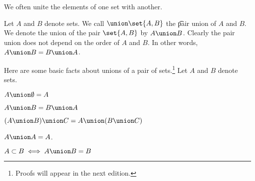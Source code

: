 

We often unite the elements of one set with another.


Let $A$ and $B$ denote sets.
We call $\union \set{A, B}$ the \t{pair union} of $A$ and $B$.
We denote the union of the pair $\set{A, B}$ by $A \union B$.
Clearly the pair union does not depend on the order of $A$ and $B$.
In other words, $A \union B = B \union A$.


Here are some basic facts about unions of a pair of sets.\footnote{Proofs will appear in the next edition.}
Let $A$ and $B$ denote sets.

\begin{proposition}
  $A \union \emptyset = A$
  \label{pair_unions:identity_element}
\end{proposition}

\begin{proposition}[Commutativity]
  $A \union B = B \union A$
\end{proposition}

\begin{proposition}[Associativity]
  $(A \union B) \union C = A \union (B \union C)$
\end{proposition}

\begin{proposition}[Idempotence]
  $A \union A = A$.
\end{proposition}

\begin{proposition}
  $A \subset B \iff A \union B = B$
\end{proposition}

\blankpage

